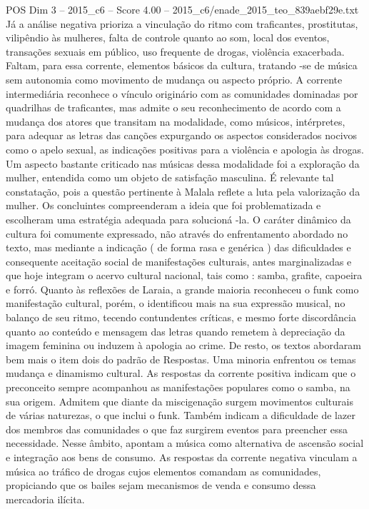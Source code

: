 \begin{textsample}{POS Dim 3 – 2015\_c6 – Score 4.00 – 2015\_c6/enade\_2015\_teo\_839aebf29e.txt}
Já a análise negativa prioriza a vinculação do ritmo com traficantes, prostitutas, vilipêndio às mulheres, falta de controle quanto ao som, local dos eventos, transações sexuais em público, uso frequente de drogas, violência exacerbada.
Faltam, para essa corrente, elementos básicos da cultura, tratando -se de música sem autonomia como movimento de mudança ou aspecto próprio.
A corrente intermediária reconhece o vínculo originário com as comunidades dominadas por quadrilhas de traficantes, mas admite o seu reconhecimento de acordo com a mudança dos atores que transitam na modalidade, como músicos, intérpretes, para adequar as letras das canções expurgando os aspectos considerados nocivos como o apelo sexual, as indicações positivas para a violência e apologia às drogas.
Um aspecto bastante criticado nas músicas dessa modalidade foi a exploração da mulher, entendida como um objeto de satisfação masculina.
É relevante tal constatação, pois a questão pertinente à Malala reflete a luta pela valorização da mulher.
Os concluintes compreenderam a ideia que foi problematizada e escolheram uma estratégia adequada para solucioná -la.
O caráter dinâmico da cultura foi comumente expressado, não através do enfrentamento abordado no texto, mas mediante a indicação ( de forma rasa e genérica ) das dificuldades e consequente aceitação social de manifestações culturais, antes marginalizadas e que hoje integram o acervo cultural nacional, tais como : samba, grafite, capoeira e forró.
Quanto às reflexões de Laraia, a grande maioria reconheceu o funk como manifestação cultural, porém, o identificou mais na sua expressão musical, no balanço de seu ritmo, tecendo contundentes críticas, e mesmo forte discordância quanto ao conteúdo e mensagem das letras quando remetem à depreciação da imagem feminina ou induzem à apologia ao crime.
De resto, os textos abordaram bem mais o item dois do padrão de Respostas.
Uma minoria enfrentou os temas mudança e dinamismo cultural.
As respostas da corrente positiva indicam que o preconceito sempre acompanhou as manifestações populares como o samba, na sua origem.
Admitem que diante da miscigenação surgem movimentos culturais de várias naturezas, o que inclui o funk.
Também indicam a dificuldade de lazer dos membros das comunidades o que faz surgirem eventos para preencher essa necessidade.
Nesse âmbito, apontam a música como alternativa de ascensão social e integração aos bens de consumo.
As respostas da corrente negativa vinculam a música ao tráfico de drogas cujos elementos comandam as comunidades, propiciando que os bailes sejam mecanismos de venda e consumo dessa mercadoria ilícita.

\end{textsample}
